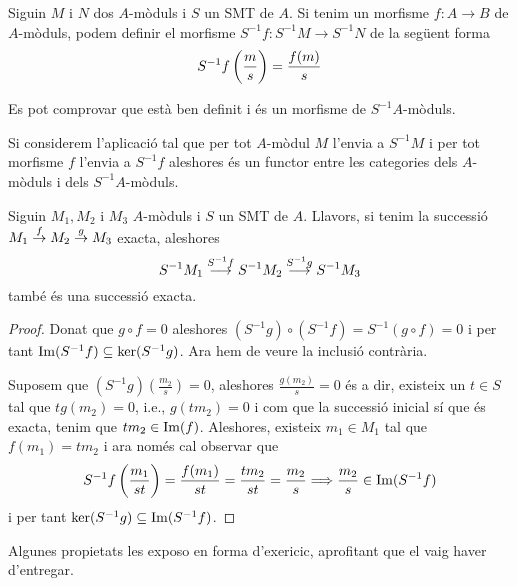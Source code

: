 \documentclass[../../../main.tex]{subfiles}
\begin{document}
\begin{defi}
[Morfisme de $S^{-1}f$] Siguin $M$ i $N$ dos $A$-mòduls i $S$ un SMT de $A$. Si tenim un morfisme $f:A\to B$ de $A$-mòduls, podem definir el morfisme $S^{-1}f:S^{-1}M\to S^{-1}N$ de la següent forma
\begin{equation}
    \notag
    S^{-1}f\left(\frac{m}{s}\right) = \frac{f(m)}{s}
\end{equation}
\end{defi}

Es pot comprovar que està ben definit i és un morfisme de $S^{-1}A$-mòduls.

\begin{nota}
Si considerem l'aplicació tal que per tot $A$-mòdul $M$ l'envia a $S^{-1}M$ i per tot morfisme $f$ l'envia a $S^{-1}f$ aleshores és un functor entre les categories dels $A$-mòduls i dels $S^{-1}A$-mòduls.
\end{nota}

\begin{prop}
\label{prop:exactitudModulFraccions} Siguin $M_1,M_2$ i $M_3$ $A$-mòduls i $S$ un SMT de $A$. Llavors, si tenim la successió $M_1\overset{f}{\to}M_2\overset{g}{\to}M_3$ exacta, aleshores
\begin{equation}
    \notag
    S^{-1}M_1\overset{S^{-1}f}{\longrightarrow}S^{-1}M_2\overset{S^{-1}g}{\longrightarrow}S^{-1}M_3
\end{equation}
també és una successió exacta.
\end{prop}
\begin{proof}
Donat que $g\circ f = 0$ aleshores $(S^{-1}g)\circ(S^{-1}f) = S^{-1}(g\circ f) = 0$ i per tant $\operatorname{Im}(S^{-1}f)\subseteq \ker(S^{-1}g)$. Ara hem de veure la inclusió contrària.

Suposem que $(S^{-1}g)\left(\frac{m_2}{s}\right) = 0$, aleshores $\frac{g(m_2)}{s} = 0$ és a dir, existeix un $t\in S$ tal que $tg(m_2) = 0$, i.e., $g(tm_2) = 0$ i com que la successió inicial sí que és exacta, tenim que $tm_2\in\operatorname{Im}(f)$. Aleshores, existeix $m_1\in M_1$ tal que $f(m_1) = tm_2$ i ara només cal observar que
\begin{equation}
    \notag
    S^{-1}f\left(\frac{m_1}{st}\right) = \frac{f(m_1)}{st} = \frac{tm_2}{st} = \frac{m_2}{s}\Longrightarrow \frac{m_2}{s}\in\operatorname{Im}(S^{-1}f)
\end{equation}
i per tant $\ker(S^{-1}g)\subseteq\operatorname{Im}(S^{-1}f)$.
\end{proof}

Algunes propietats les exposo en forma d'exericic, aprofitant que el vaig haver d'entregar.
\end{document}
